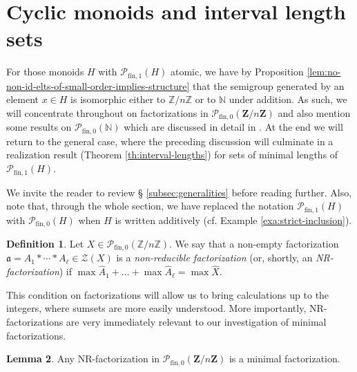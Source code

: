 \documentclass{report}
\newcommand{\NN}{\mathbb{N}}
\renewcommand{\P}{\mathcal{P}}
\newcommand{\ZZ}{\mathbb{Z}}
\newcommand{\fin}{\textrm{fin}}
\newcommand{\fun}{{\textrm{fin}, 1}}
\renewcommand{\:}{\text{:}}
\theoremstyle{definition}
\newtheorem{defn}{Definition}[section]
\newtheorem{lemma}[defn]{Lemma}
\begin{document}
\section{Cyclic monoids and interval length sets} \label{sec:finite-cyclic}
\label{sec:cyclic-case} 
For those monoids $H$ with $\P_\fun(H)$ atomic, we have by Proposition \ref{lem:no-non-id-elts-of-small-order-implies-structure} that the semigroup generated by an element $x\in H$ is isomorphic either to $\ZZ/n\ZZ$ or to $\NN$ under addition.
As such, we will concentrate throughout on factorizations in $\P_{\fin,0}(\mathbf{Z}/n\mathbf{Z})$ and also mention some results on $\P_{\fin,0}(\NN)$ which are discussed in detail in \cite[\S{ }4]{fan-tringali18}.
At the end we will return to the general case, where the preceding discussion will culminate in a realization result (Theorem \ref{th:interval-lengths}) for sets of minimal lengths of $\P_\fun(H)$.

We invite the reader to review \S{ }\ref{subsec:generalities} before reading further. Also, note that, through the whole section, we have replaced the notation $\P_\fun(H)$ with $\P_{\fin,0}(H)$ when $H$ is written additively (cf. Example \ref{exa:strict-inclusion}).


\begin{defn}\label{NR-factorization}
	Let $X \in \mathcal P_{\fin,0}(\ZZ/n\ZZ)$. We say that a non-empty factorization $\mathfrak a = A_1 \ast \cdots \ast A_\ell \in \mathcal{Z}(X)$ is a \textit{non-reducible factorization} (or, shortly, an \textit{\textup{NR}-factorization}) if $ \max\hat{A}_1 + \dots + \max\hat{A}_\ell = \max \hat{X}$.
\end{defn}

This condition on factorizations will allow us to bring calculations up to the integers, where sumsets are more easily understood.
More importantly, NR-factorizations are very immediately relevant to our investigation of minimal factorizations.

\begin{lemma}\label{NR-factorizations-are-minimal}
	Any \textup{NR}-factorization in $\P_{\fin,0}(\mathbf{Z}/n\mathbf{Z})$ is a minimal factorization.
\end{lemma}
\end{document}
